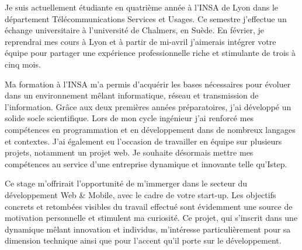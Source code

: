 \documentclass[11pt, a4paper]{awesome-cv}
\begin{document}
\makecvheader[R]


\makelettertitle

\begin{cvletter}

Je suis actuellement étudiante en quatrième année à l'INSA de Lyon dans le département Télécommunications Services et Usages. Ce semestre j'effectue un échange universitaire à l'université de Chalmers, en Suède. En février, je reprendrai mes cours à Lyon et à partir de mi-avril j'aimerais intégrer votre équipe pour partager une expérience professionnelle riche et stimulante de trois à cinq mois.

\vspace{2mm} %

Ma formation à l'INSA m'a permis d'acquérir les bases nécessaires pour évoluer dans un environnement mêlant informatique, réseau et transmission de l'information. Grâce aux deux premières années préparatoires, j'ai développé un solide socle scientifique. Lors de mon cycle ingénieur j'ai renforcé mes compétences en programmation et en développement dans de nombreux langages et contextes. J'ai également eu l'occasion de travailler en équipe sur plusieurs projets, notamment un projet web. Je souhaite désormais mettre mes compétences au service d'une entreprise dynamique et innovante telle qu'Istep.

\vspace{2mm} %

Ce stage m'offrirait l'opportunité de m'immerger dans le secteur du développement Web \& Mobile, avec le cadre de votre start-up. Les objectifs concrets et retombées visibles du travail effectué sont évidemment une source de motivation personnelle et stimulent ma curiosité. Ce projet, qui s'inscrit dans une dynamique mêlant innovation et individus, m'intéresse particulièrement pour sa dimension technique ainsi que pour l'accent qu'il porte sur le développement.  %


\end{cvletter}
\end{document}

